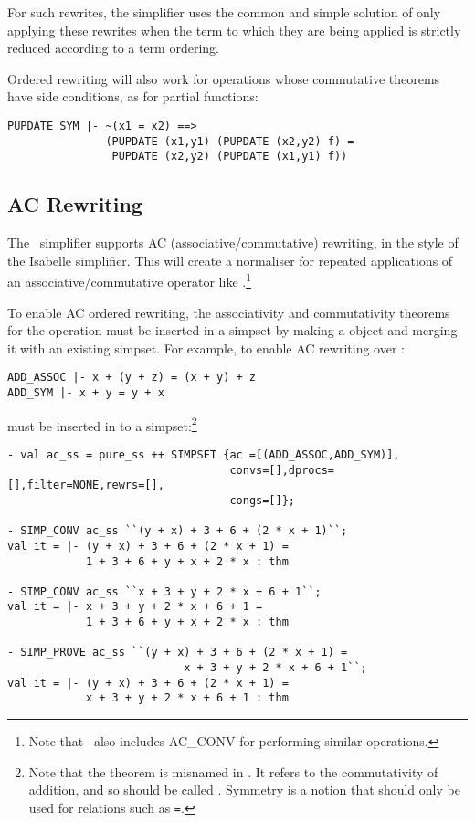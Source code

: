 For such rewrites, the simplifier uses the common and
simple solution of only applying these rewrites when the term
to which they are being applied is strictly reduced according to a term
ordering.

Ordered rewriting will also work for operations whose
commutative theorems have side
conditions, as for partial functions:
\begin{hol} \begin{verbatim}
PUPDATE_SYM |- ~(x1 = x2) ==>
               (PUPDATE (x1,y1) (PUPDATE (x2,y2) f) =
                PUPDATE (x2,y2) (PUPDATE (x1,y1) f))
\end{verbatim} \end{hol}

\subsection{AC Rewriting}

The \HOL\ simplifier supports AC (associative/commutative) rewriting,
in the style of the Isabelle simplifier.  This will create a
normaliser for repeated applications of an associative/commutative
operator like \ml{+}.\footnote{Note that \HOL\ also includes AC\_CONV
for performing similar operations.}

To enable AC ordered rewriting,
the associativity and commutativity theorems
for the operation must be inserted in a
simpset by making a  object and merging it with
an existing simpset.
For example, to enable AC rewriting over \ml{+}:
\begin{hol} \begin{verbatim}
ADD_ASSOC |- x + (y + z) = (x + y) + z
ADD_SYM |- x + y = y + x
\end{verbatim} \end{hol}
must be inserted in to a simpset:\footnote{Note that
the theorem  is misnamed in \HOL.  It refers
to the commutativity of addition, and so should be called
.
Symmetry is a notion
that should only be used for relations such as \verb!=!.}
\begin{boxed} \begin{verbatim}
- val ac_ss = pure_ss ++ SIMPSET {ac =[(ADD_ASSOC,ADD_SYM)],
                                  convs=[],dprocs=[],filter=NONE,rewrs=[],
                                  congs=[]};

- SIMP_CONV ac_ss ``(y + x) + 3 + 6 + (2 * x + 1)``;
val it = |- (y + x) + 3 + 6 + (2 * x + 1) =
            1 + 3 + 6 + y + x + 2 * x : thm

- SIMP_CONV ac_ss ``x + 3 + y + 2 * x + 6 + 1``;
val it = |- x + 3 + y + 2 * x + 6 + 1 =
            1 + 3 + 6 + y + x + 2 * x : thm

- SIMP_PROVE ac_ss ``(y + x) + 3 + 6 + (2 * x + 1) =
                           x + 3 + y + 2 * x + 6 + 1``;
val it = |- (y + x) + 3 + 6 + (2 * x + 1) =
            x + 3 + y + 2 * x + 6 + 1 : thm
\end{verbatim} \end{boxed}


